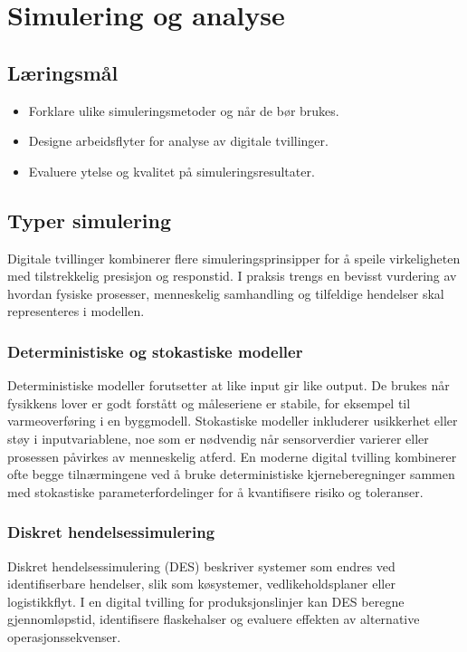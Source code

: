 \chapter{Simulering og analyse}

\section{Læringsmål}
\begin{itemize}
    \item Forklare ulike simuleringsmetoder og når de bør brukes.
    \item Designe arbeidsflyter for analyse av digitale tvillinger.
    \item Evaluere ytelse og kvalitet på simuleringsresultater.
\end{itemize}

\section{Typer simulering}
Digitale tvillinger kombinerer flere simuleringsprinsipper for å speile virkeligheten med tilstrekkelig presisjon og responstid. I praksis trengs en bevisst vurdering av hvordan fysiske prosesser, menneskelig samhandling og tilfeldige hendelser skal representeres i modellen.

\subsection{Deterministiske og stokastiske modeller}
Deterministiske modeller forutsetter at like input gir like output. De brukes når fysikkens lover er godt forstått og måleseriene er stabile, for eksempel til varmeoverføring i en byggmodell. Stokastiske modeller inkluderer usikkerhet eller støy i inputvariablene, noe som er nødvendig når sensorverdier varierer eller prosessen påvirkes av menneskelig atferd. En moderne digital tvilling kombinerer ofte begge tilnærmingene ved å bruke deterministiske kjerneberegninger sammen med stokastiske parameterfordelinger for å kvantifisere risiko og toleranser.

\subsection{Diskret hendelsessimulering}
Diskret hendelsessimulering (DES) beskriver systemer som endres ved identifiserbare hendelser, slik som køsystemer, vedlikeholdsplaner eller logistikkflyt. I en digital tvilling for produksjonslinjer kan DES beregne gjennomløpstid, identifisere flaskehalser og evaluere effekten av alternative operasjonssekvenser.

